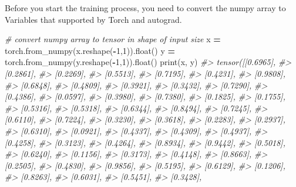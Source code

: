 \documentclass[]{book}
\newenvironment{Shaded}{\begin{snugshade}}{\end{snugshade}}
\newcommand{\BuiltInTok}[1]{#1}
\newcommand{\CommentTok}[1]{\textcolor[rgb]{0.56,0.35,0.01}{\textit{#1}}}
\newcommand{\DecValTok}[1]{\textcolor[rgb]{0.00,0.00,0.81}{#1}}
\newcommand{\NormalTok}[1]{#1}
\newcommand{\OperatorTok}[1]{\textcolor[rgb]{0.81,0.36,0.00}{\textbf{#1}}}
\begin{document}
Before you start the training process, you need to convert the numpy array to Variables that supported by Torch and autograd.

\begin{Shaded}
\begin{Highlighting}[]
\CommentTok{# convert numpy array to tensor in shape of input size}
\NormalTok{x }\OperatorTok{=}\NormalTok{ torch.from_numpy(x.reshape(}\OperatorTok{-}\DecValTok{1}\NormalTok{,}\DecValTok{1}\NormalTok{)).}\BuiltInTok{float}\NormalTok{()}
\NormalTok{y }\OperatorTok{=}\NormalTok{ torch.from_numpy(y.reshape(}\OperatorTok{-}\DecValTok{1}\NormalTok{,}\DecValTok{1}\NormalTok{)).}\BuiltInTok{float}\NormalTok{()}
\BuiltInTok{print}\NormalTok{(x, y)}
\CommentTok{#> tensor([[0.6965],}
\CommentTok{#>         [0.2861],}
\CommentTok{#>         [0.2269],}
\CommentTok{#>         [0.5513],}
\CommentTok{#>         [0.7195],}
\CommentTok{#>         [0.4231],}
\CommentTok{#>         [0.9808],}
\CommentTok{#>         [0.6848],}
\CommentTok{#>         [0.4809],}
\CommentTok{#>         [0.3921],}
\CommentTok{#>         [0.3432],}
\CommentTok{#>         [0.7290],}
\CommentTok{#>         [0.4386],}
\CommentTok{#>         [0.0597],}
\CommentTok{#>         [0.3980],}
\CommentTok{#>         [0.7380],}
\CommentTok{#>         [0.1825],}
\CommentTok{#>         [0.1755],}
\CommentTok{#>         [0.5316],}
\CommentTok{#>         [0.5318],}
\CommentTok{#>         [0.6344],}
\CommentTok{#>         [0.8494],}
\CommentTok{#>         [0.7245],}
\CommentTok{#>         [0.6110],}
\CommentTok{#>         [0.7224],}
\CommentTok{#>         [0.3230],}
\CommentTok{#>         [0.3618],}
\CommentTok{#>         [0.2283],}
\CommentTok{#>         [0.2937],}
\CommentTok{#>         [0.6310],}
\CommentTok{#>         [0.0921],}
\CommentTok{#>         [0.4337],}
\CommentTok{#>         [0.4309],}
\CommentTok{#>         [0.4937],}
\CommentTok{#>         [0.4258],}
\CommentTok{#>         [0.3123],}
\CommentTok{#>         [0.4264],}
\CommentTok{#>         [0.8934],}
\CommentTok{#>         [0.9442],}
\CommentTok{#>         [0.5018],}
\CommentTok{#>         [0.6240],}
\CommentTok{#>         [0.1156],}
\CommentTok{#>         [0.3173],}
\CommentTok{#>         [0.4148],}
\CommentTok{#>         [0.8663],}
\CommentTok{#>         [0.2505],}
\CommentTok{#>         [0.4830],}
\CommentTok{#>         [0.9856],}
\CommentTok{#>         [0.5195],}
\CommentTok{#>         [0.6129],}
\CommentTok{#>         [0.1206],}
\CommentTok{#>         [0.8263],}
\CommentTok{#>         [0.6031],}
\CommentTok{#>         [0.5451],}
\CommentTok{#>         [0.3428],}

\end{Highlighting}
\end{Shaded}
\end{document}
